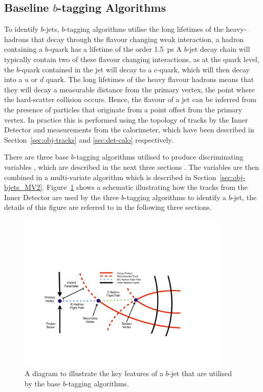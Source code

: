 \subsection{Baseline $b$-tagging Algorithms}

To identify $b$-jets, $b$-tagging algorithms utilise the long lifetimes of the heavy-hadrons that decay through the flavour changing weak interaction,
a hadron containing a $b$-quark has a lifetime of the order \SI{1.5}{\pico\second} %
A $b$-jet decay chain  will typically contain two of these flavour changing interactions, 
as at the quark level, the $b$-quark contained in the jet will decay to a $c$-quark, which will then decay into a $u$ or $d$ quark.
The long lifetimes of the heavy flavour hadrons means that they will decay a measurable distance from the 
primary vertex, the point where the hard-scatter collision occurs.
Hence, the flavour of a jet can be inferred from the presence of particles
that originate from a point offset from the primary vertex.
In practice this is performed using the topology of tracks by the Inner Detector
and measurements from the calorimeter, which have been described in Section~\ref{sec:obj-tracks} and \ref{sec:det-calo} respectively.
   
There are three base $b$-tagging algorithms utilised to produce discriminating variables \cite{obj-bjets_algo_2016}, which are described in the next three sections .
The variables are then combined in a multi-variate algorithm which is described in Section~\ref{sec:obj-bjets_MV2}.
Figure~\ref{fig:obj_bjets_schem} shows a schematic illustrating how the tracks from the Inner Detector
are used by the three $b$-tagging algorithms to identify a $b$-jet, the details of this figure are referred to in the following three sections.

\begin{figure}[!htb]
  \begin{center}
    \includegraphics[width=0.9\textwidth]{figs/Objects/bjets_schem.pdf}
    \caption{A diagram to illustrate the key features of a $b$-jet that are utilised by the base $b$-tagging algorithms.}
    \label{fig:obj_bjets_schem}
  \end{center}
  \vspace{-0.5cm}
\end{figure}

